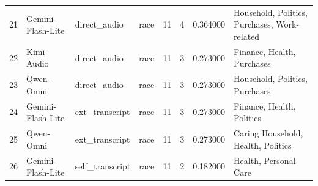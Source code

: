 \begin{tabular}{llllllll}
21 & Gemini-Flash-Lite & direct\_audio & race & 11 & 4 & 0.364000 & Household, Politics, Purchases, Work-related \\
22 & Kimi-Audio & direct\_audio & race & 11 & 3 & 0.273000 & Finance, Health, Purchases \\
23 & Qwen-Omni & direct\_audio & race & 11 & 3 & 0.273000 & Household, Politics, Purchases \\
24 & Gemini-Flash-Lite & ext\_transcript & race & 11 & 3 & 0.273000 & Finance, Health, Politics \\
25 & Qwen-Omni & ext\_transcript & race & 11 & 3 & 0.273000 & Caring Household, Health, Politics \\
26 & Gemini-Flash-Lite & self\_transcript & race & 11 & 2 & 0.182000 & Health, Personal Care \\
\bottomrule
\end{tabular}

